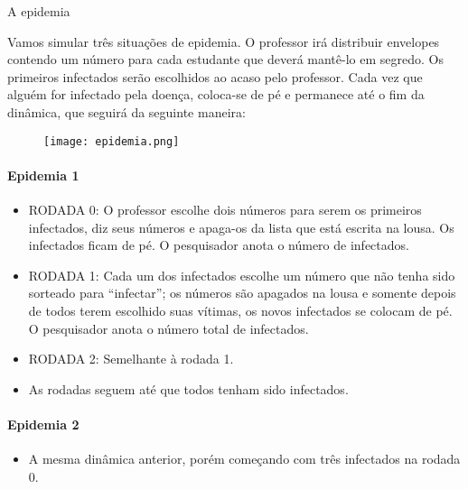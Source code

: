 \begin{task}{A epidemia}


Vamos simular três situações de epidemia. O professor irá distribuir envelopes contendo um número para cada estudante que deverá mantê-lo em segredo. Os primeiros infectados serão escolhidos ao acaso pelo professor. Cada vez que alguém for infectado pela doença, coloca-se de pé e permanece até o fim da dinâmica, que seguirá da seguinte maneira:

\begin{figure}[H]
\centering
\texttt{[image: epidemia.png]}
\end{figure}


\paragraph{Epidemia 1}

\begin{itemize}

\item RODADA 0: O professor escolhe dois números para serem os primeiros infectados, diz seus números e apaga-os da lista que está escrita na lousa. Os infectados ficam de pé. O pesquisador anota o número de infectados.

\item RODADA 1: Cada um dos infectados escolhe um número que não tenha sido sorteado para “infectar”; os números são apagados na lousa e somente depois de todos terem escolhido suas vítimas, os novos infectados se colocam de pé. O pesquisador anota o número total de infectados.

\item RODADA 2: Semelhante à rodada 1.

\item As rodadas seguem até que todos tenham sido infectados.

\end{itemize}

% 

\paragraph{Epidemia 2}

\begin{itemize}

\item A mesma dinâmica anterior, porém começando com três infectados na rodada 0.


\end{itemize}
\end{task}
